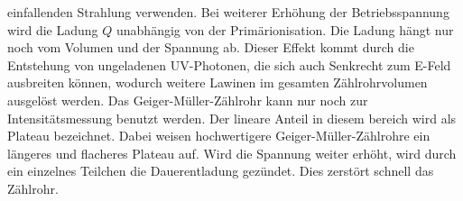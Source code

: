 einfallenden Strahlung verwenden.
Bei weiterer Erhöhung der Betriebsspannung wird die Ladung $Q$ unabhängig von der Primärionisation. 
Die Ladung hängt nur noch vom Volumen und der Spannung ab. Dieser Effekt kommt durch die Entstehung von ungeladenen UV-Photonen, die sich auch Senkrecht zum E-Feld
ausbreiten können, wodurch weitere Lawinen im gesamten Zählrohrvolumen ausgelöst werden. 
Das Geiger-Müller-Zählrohr kann nur noch zur Intensitätsmessung benutzt werden.
Der lineare Anteil in diesem bereich wird als Plateau bezeichnet. Dabei weisen hochwertigere Geiger-Müller-Zählrohre ein längeres und flacheres Plateau auf.
Wird die Spannung weiter erhöht, wird durch ein einzelnes Teilchen die Dauerentladung gezündet. Dies zerstört schnell das Zählrohr.